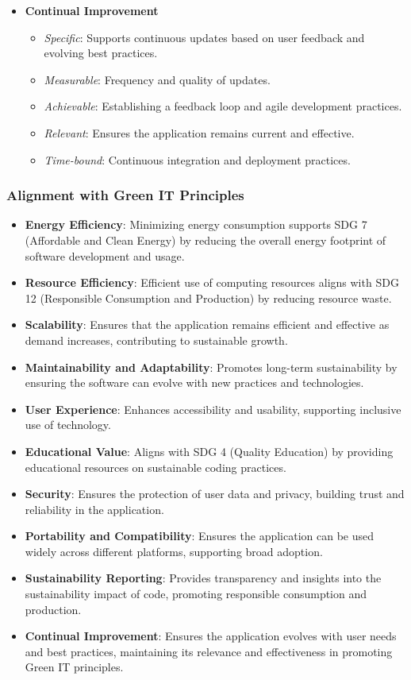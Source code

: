 \documentclass[conference,compsoc]{IEEEtran}
\begin{document}
\begin{itemize}
	\item \textbf{Continual Improvement}
	      \begin{itemize}
		      \item \textit{Specific}: Supports continuous updates based on user feedback and evolving best practices.
		      \item \textit{Measurable}: Frequency and quality of updates.
		      \item \textit{Achievable}: Establishing a feedback loop and agile development practices.
		      \item \textit{Relevant}: Ensures the application remains current and effective.
		      \item \textit{Time-bound}: Continuous integration and deployment practices.
	      \end{itemize}
\end{itemize}

\subsubsection{Alignment with Green IT Principles}
\begin{itemize}
	\item \textbf{Energy Efficiency}: Minimizing energy consumption supports SDG 7 (Affordable and Clean Energy) by reducing the overall energy footprint of software development and usage.
	\item \textbf{Resource Efficiency}: Efficient use of computing resources aligns with SDG 12 (Responsible Consumption and Production) by reducing resource waste.
	\item \textbf{Scalability}: Ensures that the application remains efficient and effective as demand increases, contributing to sustainable growth.
	\item \textbf{Maintainability and Adaptability}: Promotes long-term sustainability by ensuring the software can evolve with new practices and technologies.
	\item \textbf{User Experience}: Enhances accessibility and usability, supporting inclusive use of technology.
	\item \textbf{Educational Value}: Aligns with SDG 4 (Quality Education) by providing educational resources on sustainable coding practices.
	\item \textbf{Security}: Ensures the protection of user data and privacy, building trust and reliability in the application.
	\item \textbf{Portability and Compatibility}: Ensures the application can be used widely across different platforms, supporting broad adoption.
	\item \textbf{Sustainability Reporting}: Provides transparency and insights into the sustainability impact of code, promoting responsible consumption and production.
	\item \textbf{Continual Improvement}: Ensures the application evolves with user needs and best practices, maintaining its relevance and effectiveness in promoting Green IT principles.
\end{itemize}
\end{document}
